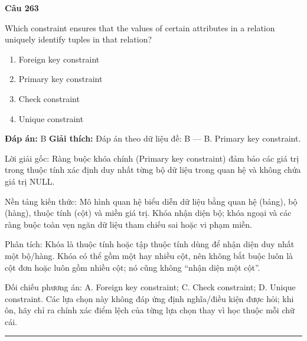 \documentclass[11pt,a4paper]{article}
\newenvironment{question}[1]{%
  \par\vspace{1em}\noindent\textbf{\large Câu #1}\par\vspace{0.4em}
}{%
  \par\vspace{1em}\hrule\vspace{0.6em}
}
\newenvironment{choices}{%
  \begin{enumerate}[label=\textbf{\Alph*.},leftmargin=2.2em,itemsep=2pt,topsep=3pt]
}{%
  \end{enumerate}
}
\newcommand{\choice}{\item}
\begin{document}
\begin{question}{263}
Which constraint ensures that the values of certain attributes in a relation uniquely identify tuples in that relation?
\begin{choices}
\choice Foreign key constraint
\choice Primary key constraint
\choice Check constraint
\choice Unique constraint
\end{choices}
\textbf{Đáp án:} B
\textbf{Giải thích:} Đáp án theo dữ liệu đề: B — B. Primary key constraint.

Lời giải gốc: Ràng buộc khóa chính (Primary key constraint) đảm bảo các giá trị trong thuộc tính xác định duy nhất từng bộ dữ liệu trong quan hệ và không chứa giá trị NULL.

Nền tảng kiến thức: Mô hình quan hệ biểu diễn dữ liệu bằng quan hệ (bảng), bộ (hàng), thuộc tính (cột) và miền giá trị. Khóa nhận diện bộ; khóa ngoại và các ràng buộc toàn vẹn ngăn dữ liệu tham chiếu sai hoặc vi phạm miền.

Phân tích: Khóa là thuộc tính hoặc tập thuộc tính dùng để nhận diện duy nhất một bộ/hàng. Khóa có thể gồm một hay nhiều cột, nên không bắt buộc luôn là cột đơn hoặc luôn gồm nhiều cột; nó cũng không “nhận diện một cột”.

Đối chiếu phương án: A. Foreign key constraint; C. Check constraint; D. Unique constraint. Các lựa chọn này không đáp ứng định nghĩa/điều kiện được hỏi; khi ôn, hãy chỉ ra chính xác điểm lệch của từng lựa chọn thay vì học thuộc mỗi chữ cái.
\end{question}
\end{document}
